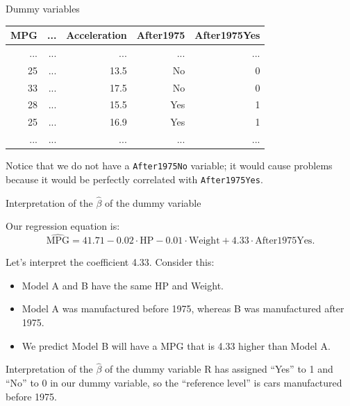 \documentclass{beamer}\usepackage[]{graphicx}\usepackage[]{color}
\begin{document}
\begin{darkframes}
\begin{frame}[fragile]{Dummy variables}
      \begin{table}[!b]
        {\carlitoTLF %
        \begin{tabularx}{\textwidth}{rrrrr}

           MPG &  ... & Acceleration & After1975 & After1975Yes\\
          \toprule
            ... & ... & ... & ... & ... \\
            25 & ... & 13.5 & No & 0 \\
            33 & ... & 17.5 & No & 0 \\
            28 & ... & 15.5 & Yes & 1 \\
            25 & ... & 16.9 & Yes & 1 \\
            ... & ... & ... & ... & ... \\
          \bottomrule

        \end{tabularx}}

      \end{table}

      \pause
      Notice that we do not have a \texttt{After1975No} variable; it would cause problems because it would be perfectly correlated with \texttt{After1975Yes}.
    \end{frame}

    \begin{frame}[fragile]{Interpretation of the $\hat\beta$ of the dummy variable}
      
      Our regression equation is:
      \[
        \widehat{\text{MPG}} = 41.71 -
        0.02 \cdot \text{HP} -
        0.01 \cdot \text{Weight} +
        4.33 \cdot \text{After1975Yes}.
      \]
      \pause

      Let's interpret the coefficient 4.33.
      Consider this:
      \begin{itemize}[<+->]
        \item Model A and B have the same HP and Weight.
        \item Model A was manufactured before 1975, whereas B was manufactured after 1975.
        \item We predict Model B will have a MPG that is 4.33 higher than Model A.
      \end{itemize}
      \lc
    \end{frame}

    \begin{frame}[fragile]{Interpretation of the $\hat\beta$ of the dummy variable}
      R has assigned ``Yes'' to 1 and ``No'' to 0 in our dummy variable, so the ``reference level'' is cars manufactured before 1975.
      \pause\bigskip


\end{frame}
\end{darkframes}
\end{document}
